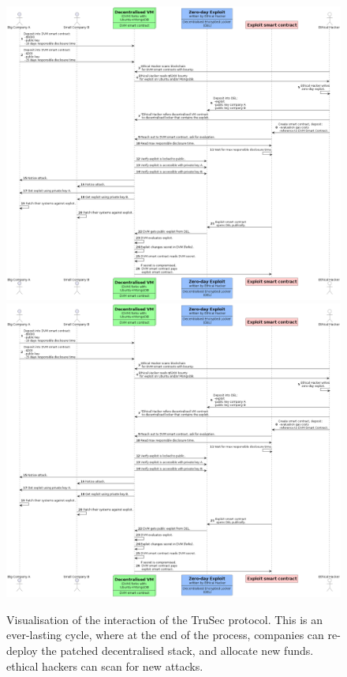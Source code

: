 \begin{figure}[H]
    \centering
    \ifx\homepath\overleafhome
        \includegraphics[width=1.0\textwidth]{Images/Diagrams/interaction.png}
    \else
        \includegraphics[width=1.0\textwidth]{latex/Images/Diagrams/interaction.png}
    \fi
    
    \caption{Visualisation of the interaction of the TruSec protocol. This is an ever-lasting cycle, where at the end of the process, companies can re-deploy the patched decentralised stack, and allocate new funds. ethical hackers can scan for new attacks.}
    \label{fig:interaction}
\end{figure}
\noindent 




